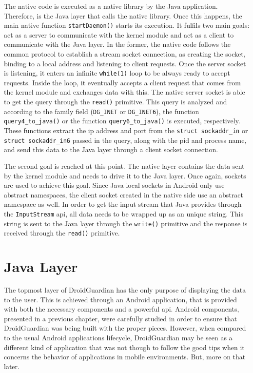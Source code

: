 The native code is executed as a native library by the Java application. Therefore, is the Java layer that calls the native library. Once this happens, the main native function \texttt{startDaemon()} starts its execution. It fulfils two main goals: act as a server to communicate with the kernel module and act as a client to communicate with the Java layer. In the former, the native code follows the common protocol to establish a stream socket connection, as creating the socket, binding to a local address and listening to client requests. Once the server socket is listening, it enters an infinite \texttt{while(1)} loop to be always ready to accept requests. Inside the loop, it eventually accepts a client request that comes from the kernel module and exchanges data with this. The native server socket is able to get the query through the \texttt{read()} primitive. This query is analyzed and according to the family field (\texttt{DG\_INET} or \texttt{DG\_INET6}), the function \texttt{query4\_to\_java()} or the function \texttt{query6\_to\_java()} is executed, respectively. These functions extract the \gls{ip} address and port from the \texttt{struct sockaddr\_in} or \texttt{struct sockaddr\_in6} passed in the query, along with the pid and process name, and send this data to the Java layer through a client socket connection. 

The second goal is reached at this point. The native layer contains the data sent by the kernel module and needs to drive it to the Java layer. Once again, sockets are used to achieve this goal. Since Java local sockets in Android only use abstract namespaces, the client socket created in the native side use an abstract namespace as well. In order to get the input stream that Java provides through the \texttt{InputStream} \gls{api}, all data needs to be wrapped up as an unique string. This string is sent to the Java layer through the \texttt{write()} primitive and the response is received through the \texttt{read()} primitive.

\section{Java Layer}

The topmost layer of DroidGuardian has the only purpose of displaying the data to the user. This is achieved through an Android application, that is provided with both the necessary components and a powerful \gls{api}. Android components, presented in a previous chapter, were carefully studied in order to ensure that DroidGuardian was being built with the proper pieces. However, when compared to the usual Android applications lifecycle, DroidGuardian may be seen as a different kind of application that was not though to follow the good tips when it concerns the behavior of applications in mobile environments. But, more on that later.

